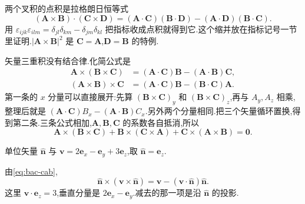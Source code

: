 两个叉积的点积是拉格朗日恒等式
\begin{equation}
  (\mathbf{A}\times\mathbf{B})\cdot(\mathbf{C}\times\mathbf{D})
  =(\mathbf{A}\cdot\mathbf{C})(\mathbf{B}\cdot\mathbf{D})
  -(\mathbf{A}\cdot\mathbf{D})(\mathbf{B}\cdot\mathbf{C}).
  \label{eq:lagrange-identity}
\end{equation}
用 $\varepsilon_{ijk}\varepsilon_{ilm}=\delta_{jl}\delta_{km}-\delta_{jm}\delta_{kl}$ 把指标收成点积就得到它.这个缩并放在指标记号一节里证明.$|\mathbf{A}\times\mathbf{B}|^2$ 是 $\mathbf{C}=\mathbf{A}$,$\mathbf{D}=\mathbf{B}$ 的特例.

矢量三重积没有结合律.化简公式是
\begin{equation}
\begin{aligned}
  \mathbf{A}\times(\mathbf{B}\times\mathbf{C})
  &=(\mathbf{A}\cdot\mathbf{C})\mathbf{B}-(\mathbf{A}\cdot\mathbf{B})\mathbf{C}, \\
  (\mathbf{A}\times\mathbf{B})\times\mathbf{C}
  &=(\mathbf{A}\cdot\mathbf{C})\mathbf{B}-(\mathbf{B}\cdot\mathbf{C})\mathbf{A}.
\end{aligned}
\label{eq:bac-cab}
\end{equation}
第一条的 $x$ 分量可以直接展开:先算 $(\mathbf{B}\times\mathbf{C})_y$ 和 $(\mathbf{B}\times\mathbf{C})_z$,再与 $A_y,A_z$ 相乘,整理后就是 $(\mathbf{A}\cdot\mathbf{C})B_x-(\mathbf{A}\cdot\mathbf{B})C_x$.另外两个分量相同.把三个矢量循环置换,得到第二条.三条公式相加,$\mathbf{A},\mathbf{B},\mathbf{C}$ 的系数各自抵消,所以
\begin{equation}
  \mathbf{A}\times(\mathbf{B}\times\mathbf{C})
  +\mathbf{B}\times(\mathbf{C}\times\mathbf{A})
  +\mathbf{C}\times(\mathbf{A}\times\mathbf{B})
  =\mathbf{0}.
\end{equation}

\begin{example}
单位矢量 $\hat{\mathbf{n}}$ 与 $\mathbf{v}=2\mathbf{e}_x-\mathbf{e}_y+3\mathbf{e}_z$,取 $\hat{\mathbf{n}}=\mathbf{e}_z$.
\end{example}
\begin{solution}
由\eqref{eq:bac-cab},
\begin{equation}
  \hat{\mathbf{n}}\times(\mathbf{v}\times\hat{\mathbf{n}})
  =\mathbf{v}-(\mathbf{v}\cdot\hat{\mathbf{n}})\hat{\mathbf{n}}.
\end{equation}
这里 $\mathbf{v}\cdot\mathbf{e}_z=3$,垂直分量是 $2\mathbf{e}_x-\mathbf{e}_y$.减去的那一项是沿 $\hat{\mathbf{n}}$ 的投影.
\end{solution}
